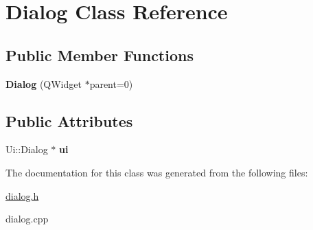 \hypertarget{classDialog}{\section{\-Dialog \-Class \-Reference}
\label{classDialog}
}
\subsection*{\-Public \-Member \-Functions}
\begin{DoxyCompactItemize}
\item 
\hypertarget{classDialog_acfa2063f9f962d394c6a645b6e7e08d8}{{\bfseries \-Dialog} (\-Q\-Widget $\ast$parent=0)}\label{classDialog_acfa2063f9f962d394c6a645b6e7e08d8}

\end{DoxyCompactItemize}
\subsection*{\-Public \-Attributes}
\begin{DoxyCompactItemize}
\item 
\hypertarget{classDialog_aaa4b5bfb9a0f64900d524f14bc32e6df}{\-Ui\-::\-Dialog $\ast$ {\bfseries ui}}\label{classDialog_aaa4b5bfb9a0f64900d524f14bc32e6df}

\end{DoxyCompactItemize}


\-The documentation for this class was generated from the following files\-:\begin{DoxyCompactItemize}
\item 
\hyperlink{dialog_8h}{dialog.\-h}\item 
dialog.\-cpp\end{DoxyCompactItemize}
